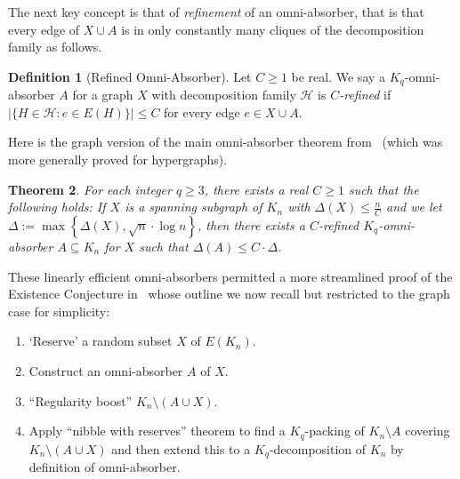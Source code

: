 \documentclass[11pt]{article}
\numberwithin{equation}{section}
\newcounter{i}
\theoremstyle{plain}
\newtheorem{thm}{Theorem}[section]
\theoremstyle{plain} %
\theoremstyle{definition}
\newtheorem{definition}[thm]{Definition}
\begin{document}
The next key concept is that of \emph{refinement} of an omni-absorber, that is that every edge of $X\cup A$ is in only constantly many cliques of the decomposition family as follows.

\begin{definition}[Refined Omni-Absorber]
Let $C\ge 1$ be real. We say a $K_q$-omni-absorber $A$ for a graph $X$ with decomposition family $\mathcal{H}$ is \emph{$C$-refined} if $|\{H\in \mathcal{H} : e\in E(H) \}| \le C$ for every edge $e\in X\cup A$.
\end{definition}

Here is the graph version of the main omni-absorber theorem from~\cite{DPI} (which was more generally proved for hypergraphs).

\begin{thm}\label{thm:omni-absorber}
    For each integer $q \ge 3$, there exists a real $C\ge 1$ such that the following holds: If $X$ is a spanning subgraph of $K_n$ with $\Delta(X) \le \frac{n}{C}$ and we let $\Delta:= \max\left\{\Delta(X),\sqrt{n}\cdot \log n\right\}$, then there exists a $C$-refined $K_q$-omni-absorber $A \subseteq K_n$ for $X$ such that $\Delta(A)\le C \cdot \Delta$.
\end{thm}

These linearly efficient omni-absorbers permitted a more streamlined proof of the Existence Conjecture in~\cite{DPI} whose outline we now recall but restricted to the graph case for simplicity:

\begin{enumerate}
    \item[(1)] `Reserve' a random subset $X$ of $E(K_n)$.
    \item[(2)] Construct an omni-absorber $A$ of $X$.
    \item[(3)] ``Regularity boost'' $K_n\setminus (A\cup X)$.
    \item[(4)] Apply ``nibble with reserves'' theorem to find a $K_q$-packing of $K_n\setminus A$ covering $K_n\setminus (A\cup X)$ and then extend this to a $K_q$-decomposition of $K_n$ by definition of omni-absorber.  
\end{enumerate}

\end{document}
